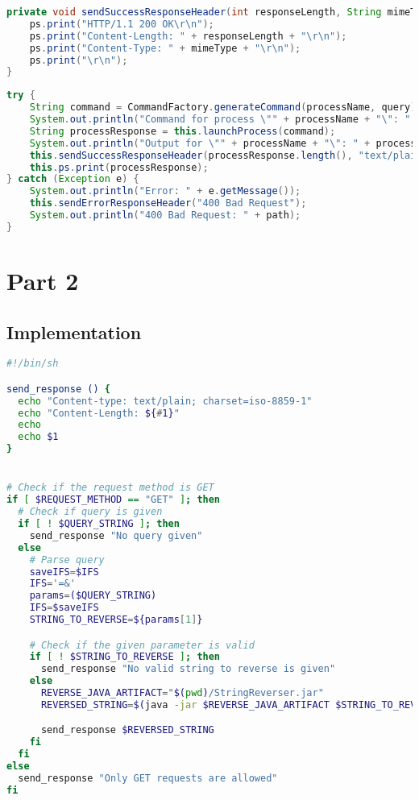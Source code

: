 \begin{lstlisting}[label=lst:01_part1_impl_tinyhttpd_sendSuccessResponseHeader, caption=Implementation of the \texttt{sendSuccessResponseHeader} method, language=java]
private void sendSuccessResponseHeader(int responseLength, String mimeType) {
    ps.print("HTTP/1.1 200 OK\r\n");
    ps.print("Content-Length: " + responseLength + "\r\n");
    ps.print("Content-Type: " + mimeType + "\r\n");
    ps.print("\r\n");
}
\end{lstlisting}

\begin{lstlisting}[label=lst:01_part1_impl_tinyhttpd_implsteps, caption=Implementation of the steps 2 to 4, language=java]
try {
    String command = CommandFactory.generateCommand(processName, query);
    System.out.println("Command for process \"" + processName + "\": " + command);
    String processResponse = this.launchProcess(command);
    System.out.println("Output for \"" + processName + "\": " + processResponse);
    this.sendSuccessResponseHeader(processResponse.length(), "text/plain");
    this.ps.print(processResponse);
} catch (Exception e) {
    System.out.println("Error: " + e.getMessage());
    this.sendErrorResponseHeader("400 Bad Request");
    System.out.println("400 Bad Request: " + path);
}
\end{lstlisting}


\newpage
\section{Part 2}

\subsection{Implementation}

\begin{lstlisting}[label=lst:02_part2_impl_script, caption=Implementation of the cgi-bin script, language=bash]
#!/bin/sh

send_response () {
  echo "Content-type: text/plain; charset=iso-8859-1"
  echo "Content-Length: ${#1}"
  echo
  echo $1
}


# Check if the request method is GET
if [ $REQUEST_METHOD == "GET" ]; then
  # Check if query is given
  if [ ! $QUERY_STRING ]; then
    send_response "No query given"
  else
    # Parse query
    saveIFS=$IFS
    IFS='=&'
    params=($QUERY_STRING)
    IFS=$saveIFS
    STRING_TO_REVERSE=${params[1]}

    # Check if the given parameter is valid
    if [ ! $STRING_TO_REVERSE ]; then
      send_response "No valid string to reverse is given"
    else
      REVERSE_JAVA_ARTIFACT="$(pwd)/StringReverser.jar"
      REVERSED_STRING=$(java -jar $REVERSE_JAVA_ARTIFACT $STRING_TO_REVERSE)

      send_response $REVERSED_STRING
    fi
  fi
else
  send_response "Only GET requests are allowed"
fi
\end{lstlisting}
